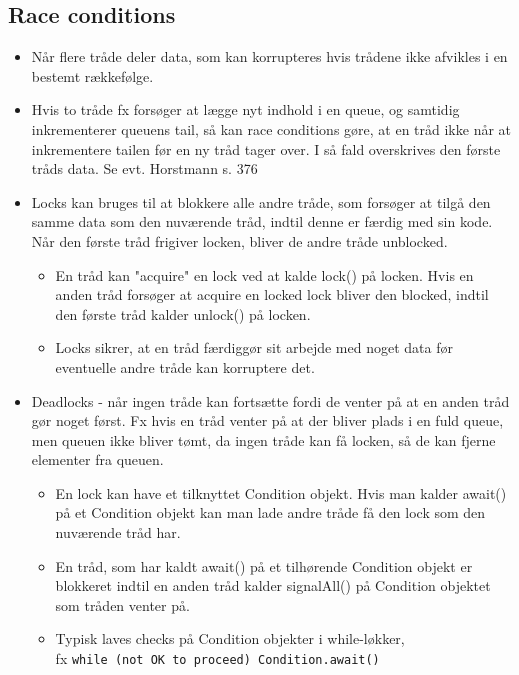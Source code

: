 \subsection{Race conditions}

\begin{itemize}
  \item Når flere tråde deler data, som kan korrupteres hvis trådene ikke afvikles i en bestemt rækkefølge.
  \item Hvis to tråde fx forsøger at lægge nyt indhold i en queue, og samtidig inkrementerer queuens tail, så kan race conditions gøre, at en tråd ikke når at inkrementere tailen før en ny tråd tager over. I så fald overskrives den første tråds data. Se evt. Horstmann s. 376
  \item Locks kan bruges til at blokkere alle andre tråde, som forsøger at tilgå den samme data som den nuværende tråd, indtil denne er færdig med sin kode. Når den første tråd frigiver locken, bliver de andre tråde unblocked.
  \begin{itemize}
    \item En tråd kan "acquire" en lock ved at kalde lock() på locken. Hvis en anden tråd forsøger at acquire en locked lock bliver den blocked, indtil den første tråd kalder unlock() på locken.
    \item Locks sikrer, at en tråd færdiggør sit arbejde med noget data før eventuelle andre tråde kan korruptere det.
  \end{itemize}

  \item Deadlocks - når ingen tråde kan fortsætte fordi de venter på at en anden tråd gør noget først. Fx hvis en tråd venter på at der bliver plads i en fuld queue, men queuen ikke bliver tømt, da ingen tråde kan få locken, så de kan fjerne elementer fra queuen.
  \begin{itemize}
    \item En lock kan have et tilknyttet Condition objekt. Hvis man kalder await() på et Condition objekt kan man lade andre tråde få den lock som den nuværende tråd har.
    \item En tråd, som har kaldt await() på et tilhørende Condition objekt er blokkeret indtil en anden tråd kalder signalAll() på Condition objektet som tråden venter på.
    \item Typisk laves checks på Condition objekter i while-løkker, \\
    fx \verb|while (not OK to proceed) Condition.await()|
  \end{itemize}


\end{itemize}
